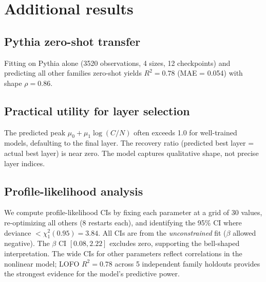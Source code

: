 \documentclass{article}
\begin{document}



\appendix
\section{Additional results}

\subsection{Pythia zero-shot transfer}
\label{app:zeroshot}

Fitting on Pythia alone (3520 observations, 4 sizes, 12 checkpoints) and predicting all other families zero-shot yields $R^2 = 0.78$ (MAE = 0.054) with shape $\rho = 0.86$.

\subsection{Practical utility for layer selection}
\label{app:utility}

The predicted peak $\mu_0 + \mu_1 \log(C/N)$ often exceeds 1.0 for well-trained models, defaulting to the final layer. The recovery ratio (predicted best layer = actual best layer) is near zero. The model captures qualitative shape, not precise layer indices.

\subsection{Profile-likelihood analysis}

We compute profile-likelihood CIs by fixing each parameter at a grid of 30 values, re-optimizing all others (8 restarts each), and identifying the 95\% CI where deviance $< \chi^2_1(0.95) = 3.84$. All CIs are from the \emph{unconstrained} fit ($\beta$ allowed negative). The $\beta$ CI $[0.08, 2.22]$ excludes zero, supporting the bell-shaped interpretation. The wide CIs for other parameters reflect correlations in the nonlinear model; LOFO $R^2 = 0.78$ across 5 independent family holdouts provides the strongest evidence for the model's predictive power.
\end{document}
